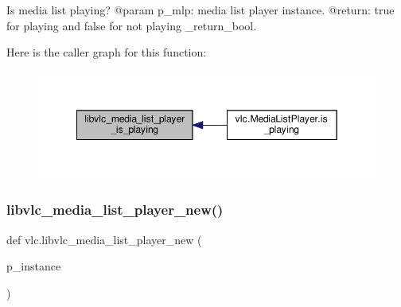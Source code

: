 \begin{DoxyVerb}Is media list playing?
@param p_mlp: media list player instance.
@return: true for playing and false for not playing \libvlc_return_bool.
\end{DoxyVerb}
 Here is the caller graph for this function\+:
\nopagebreak
\begin{figure}[H]
\begin{center}
\leavevmode
\includegraphics[width=349pt]{namespacevlc_a0c4e9ab9a5ffb361e99a2d4f61386e4c_icgraph}
\end{center}
\end{figure}
\mbox{\label{namespacevlc_ab4b8362acc8c1e94658a0dd96bc5a120}} 
\subsubsection{\texorpdfstring{libvlc\+\_\+media\+\_\+list\+\_\+player\+\_\+new()}{libvlc\_media\_list\_player\_new()}}
{\footnotesize\ttfamily def vlc.\+libvlc\+\_\+media\+\_\+list\+\_\+player\+\_\+new (\begin{DoxyParamCaption}\item[{}]{p\+\_\+instance }\end{DoxyParamCaption})}

